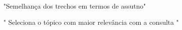 

"Semelhança dos trechos em termos de assutno"

" Seleciona o tópico com maior relevância com a consulta "







